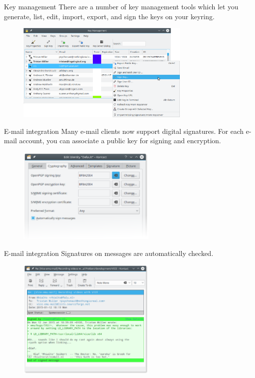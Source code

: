 \documentclass[%
mode=present,%
paper=smartboard,
size=20pt,
]{powerdot}
\begin{document}
\begin{slide}{Key management}
  There are a number of key management tools which let you generate,
  list, edit, import, export, and sign the keys on your keyring.
  \begin{figure}[H]
    \centering
    \includegraphics[width=0.75\textwidth]{images/kgpg1.eps}
    \label{fig:kgpg1}
  \end{figure}
\end{slide}

\begin{slide}{E-mail integration}
  Many e-mail clients now support digital signatures.  For each e-mail
  account, you can associate a public key for signing and encryption.
  \begin{figure}[H]
    \centering
    \includegraphics[width=0.6\textwidth]{images/kmail_conf.eps}
    \label{fig:kmail_conf}
  \end{figure}
\end{slide}

\begin{slide}[toc=]{E-mail integration}
  Signatures on messages are automatically checked.
  \begin{figure}[H]
    \centering
    \includegraphics[width=0.6\textwidth]{images/kmail_recvd.eps}
    \label{fig:kmail_recvd}
  \end{figure}
\end{slide}
\end{document}
